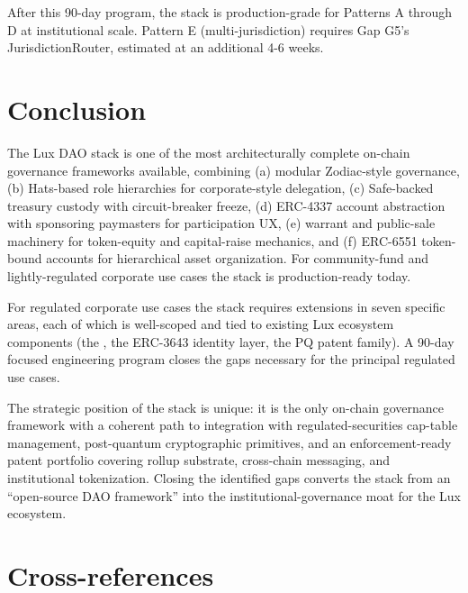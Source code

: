 \documentclass[11pt,letterpaper]{article}
\begin{document}
After this 90-day program, the stack is production-grade for Patterns A through D at institutional scale. Pattern E (multi-jurisdiction) requires Gap G5's JurisdictionRouter, estimated at an additional 4-6 weeks.

\section{Conclusion}

The Lux DAO stack is one of the most architecturally complete on-chain governance frameworks available, combining (a) modular Zodiac-style governance, (b) Hats-based role hierarchies for corporate-style delegation, (c) Safe-backed treasury custody with circuit-breaker freeze, (d) ERC-4337 account abstraction with sponsoring paymasters for participation UX, (e) warrant and public-sale machinery for token-equity and capital-raise mechanics, and (f) ERC-6551 token-bound accounts for hierarchical asset organization. For community-fund and lightly-regulated corporate use cases the stack is production-ready today.

For regulated corporate use cases the stack requires extensions in seven specific areas, each of which is well-scoped and tied to existing Lux ecosystem components (the , the ERC-3643 identity layer, the PQ patent family). A 90-day focused engineering program closes the gaps necessary for the principal regulated use cases.

The strategic position of the stack is unique: it is the only on-chain governance framework with a coherent path to integration with regulated-securities cap-table management, post-quantum cryptographic primitives, and an enforcement-ready patent portfolio covering rollup substrate, cross-chain messaging, and institutional tokenization. Closing the identified gaps converts the stack from an ``open-source DAO framework'' into the institutional-governance moat for the Lux ecosystem.

\section*{Cross-references}
\end{document}
